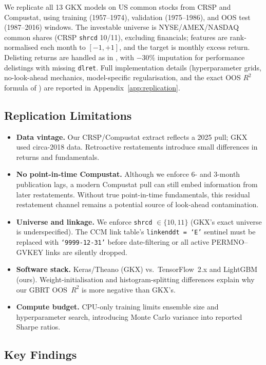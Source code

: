 \documentclass[11pt,a4paper]{article}
\begin{document}
We replicate all 13 GKX models on US common stocks from CRSP and Compustat, using training (1957--1974), validation (1975--1986), and OOS test (1987--2016) windows. The investable universe is NYSE/AMEX/NASDAQ common shares (CRSP \texttt{shrcd} 10/11), excluding financials; features are rank-normalised each month to $[-1,+1]$, and the target is monthly excess return. Delisting returns are handled as in \citet{ShumwayWarther1999}, with $-30\%$ imputation for performance delistings with missing \texttt{dlret}. Full implementation details (hyperparameter grids, no-look-ahead mechanics, model-specific regularisation, and the exact OOS $R^2$ formula of \citet{CampbellThompson2008}) are reported in Appendix~\ref{app:replication}.

\subsection{Replication Limitations}

\begin{itemize}[leftmargin=*, noitemsep, topsep=1pt]
  \item \textbf{Data vintage.} Our CRSP/Compustat extract reflects a 2025 pull; GKX used circa-2018 data. Retroactive restatements introduce small differences in returns and fundamentals.
  \item \textbf{No point-in-time Compustat.} Although we enforce 6- and 3-month publication lags, a modern Compustat pull can still embed information from later restatements. Without true point-in-time fundamentals, this residual restatement channel remains a potential source of look-ahead contamination.
  \item \textbf{Universe and linkage.} We enforce \texttt{shrcd} $\in\{10,11\}$ (GKX's exact universe is underspecified). The CCM link table's \texttt{linkenddt = `E'} sentinel must be replaced with \texttt{`9999-12-31'} before date-filtering or all active PERMNO--GVKEY links are silently dropped.
  \item \textbf{Software stack.} Keras/Theano (GKX) vs.\ TensorFlow~2.x and LightGBM (ours). Weight-initialisation and histogram-splitting differences explain why our GBRT OOS~$R^2$ is more negative than GKX's.
  \item \textbf{Compute budget.} CPU-only training limits ensemble size and hyperparameter search, introducing Monte Carlo variance into reported Sharpe ratios.
\end{itemize}

\subsection{Key Findings}
\end{document}
